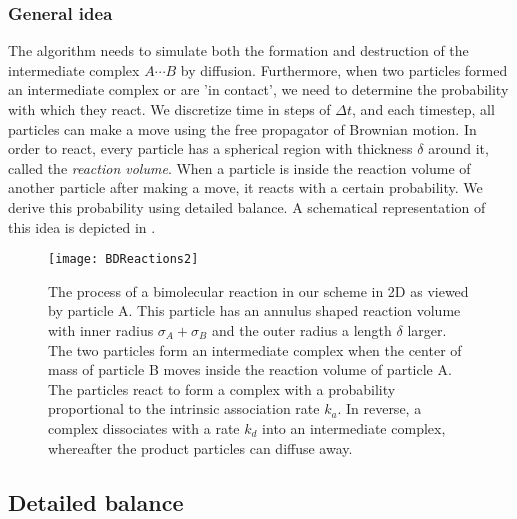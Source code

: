 \subsubsection{General idea}
The algorithm needs to simulate both the formation and destruction of the intermediate complex $A\cdots B$ by diffusion. Furthermore, when two particles formed an intermediate complex or are 'in contact', we need to determine the probability with which they react. We discretize time in steps of $\Delta t$, and each timestep, all particles can make a move using the free propagator of Brownian motion. In order to react, every particle has a spherical region with thickness $\delta$ around it, called the \emph{reaction volume}. When a particle is inside the reaction volume of another particle after making a move, it reacts with a certain probability. We derive this probability using detailed balance. A schematical representation of this idea is depicted in .

\begin{figure}[ht]
\centering
\texttt{[image: BDReactions2]}
\caption{ The process of a bimolecular reaction in our scheme in 2D as viewed by particle A. This particle has an annulus shaped reaction volume with inner radius $\sigma_A + \sigma_B$ and the outer radius a length $\delta$ larger. The two particles form an intermediate complex when the center of mass of particle B moves inside the reaction volume of particle A. The particles react to form a complex with a probability proportional to the intrinsic association rate $k_a$. In reverse, a complex dissociates with a rate $k_d$ into an intermediate complex, whereafter the product particles can diffuse away.}
\end{figure}
 
\subsection{Detailed balance}

